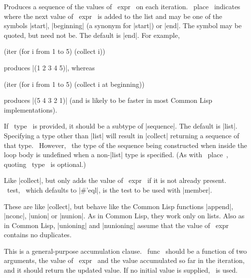 \begin{clauses}

Produces a sequence of the values of ~expr~ on each iteration. ~place~
indicates where the next value of ~expr~ is added to the list and may
be one of the symbols |start|, |beginning| (a synonym for |start|) or
|end|.  The symbol may be quoted, but need not be.  The default is
|end|.  For example,
\begin{program}
(iter (for i from 1 to 5)
      (collect i))
\end{program}
produces |(1 2 3 4 5)|, whereas
\begin{program}
(iter (for i from 1 to 5)
      (collect i at beginning))
\end{program}
produces |(5 4 3 2 1)| (and is likely to be faster in most Common Lisp
implementations).

\cpar If ~type~ is provided, it should be a subtype of |sequence|.
The default is |list|.  Specifying a type other than |list| will
result in |collect| returning a sequence of that type.  ~However,~ the
type of the sequence being constructed when inside the loop body is
undefined when a non-|list| type is specified.  (As with ~place~,
quoting ~type~ is optional.)

Like |collect|, but only adds the value of ~expr~ if it is not
already present.  ~test,~ which defaults to |\#'eql|, is
the test to be used with |member|.

\startitem
{}
\finishitem
These are like |collect|, but behave like the Common Lisp functions
|append|, |nconc|, |union| or |nunion|.
As in Common Lisp, they work only on lists.  Also as in Common Lisp,
|unioning| and |nunioning| assume that the value of ~expr~ contains no
duplicates.

This is a general-purpose accumulation clause. ~func~ should be a
function of two arguments, the value of ~expr~ and the value
accumulated so far in the iteration, and it should return the updated
value.  If no initial value is supplied, \nil\ is used.


\end{clauses}
